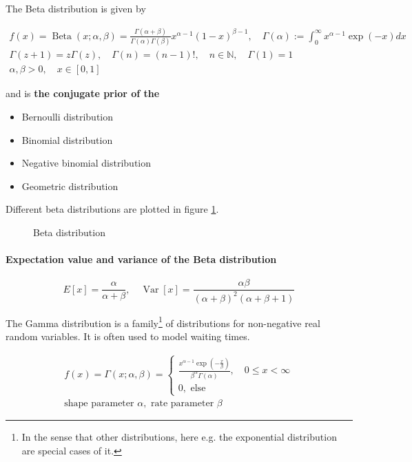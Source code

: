 The Beta distribution is given by

\begin{equation}
    \begin{gathered}
    f(x)=\operatorname{Beta}(x ; \alpha, \beta)=\frac{\Gamma(\alpha+\beta)}{\Gamma(\alpha) \Gamma(\beta)} x^{\alpha-1}(1-x)^{\beta-1}, \quad \Gamma(\alpha):=\int_0^{\infty} x^{\alpha-1} \exp (-x) d x \\
    \Gamma(z+1)=z \Gamma(z), \quad \Gamma(n)=(n-1) !, \quad n \in \mathbb{N}, \quad \Gamma(1)=1 \\
    \alpha, \beta>0, \quad x \in[0,1]
    \end{gathered}
\end{equation}

and is \textbf{the conjugate prior of the}
\begin{itemize}
    \item Bernoulli distribution
    \item Binomial distribution
    \item Negative binomial distribution
    \item Geometric distribution
\end{itemize}

Different beta distributions are plotted in figure \ref{fig:beta}.

\begin{figure}[!htb]
    \centering
    
    \caption{Beta distribution}
    \label{fig:beta}
\end{figure}

\paragraph*{Expectation value and variance of the Beta distribution}
\begin{equation}
    E[x]=\frac{\alpha}{\alpha+\beta}, \quad \operatorname{Var}[x]=\frac{\alpha \beta}{(\alpha+\beta)^2(\alpha+\beta+1)}
\end{equation}

The Gamma distribution is a family\footnote{In the sense that other
distributions, here e.g. the exponential distribution are special cases of it.} of distributions for non-negative real random variables.
It is often used to model waiting times.

\begin{equation}
    \begin{gathered}
        f(x)=\Gamma(x ; \alpha, \beta)=\left\{\begin{array}{c}
            \frac{x^{\alpha-1} \exp \left(-\frac{x}{\beta}\right)}{\beta^\alpha \Gamma(\alpha)}, \quad 0 \leq x<\infty \\
            0, \text { else }
        \end{array}\right. \\
        \text{shape parameter } \alpha, \text{ rate parameter } \beta
    \end{gathered}
\end{equation}

